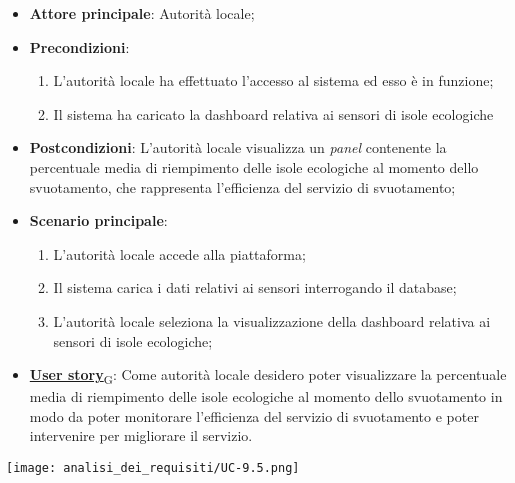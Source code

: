 \begin{itemize}
	\item \textbf{Attore principale}: Autorità locale;
	\item \textbf{Precondizioni}:
	      \begin{enumerate}
		      \item L'autorità locale ha effettuato l'accesso al sistema ed esso è in funzione;
		      \item Il sistema ha caricato la dashboard relativa ai sensori di isole ecologiche
	      \end{enumerate}
	\item \textbf{Postcondizioni}: L'autorità locale visualizza un \textit{panel} contenente la percentuale media di riempimento delle isole ecologiche al momento dello svuotamento,
	      che rappresenta l'efficienza del servizio di svuotamento;
	\item \textbf{Scenario principale}:
	      \begin{enumerate}
		      \item L'autorità locale accede alla piattaforma;
		      \item Il sistema carica i dati relativi ai sensori interrogando il database;
		      \item L'autorità locale seleziona la visualizzazione della dashboard relativa ai sensori di isole ecologiche;
	      \end{enumerate}
	\item \href{https://7last.github.io/docs/rtb/documentazione-interna/glossario\#user-story}{\textbf{User story}\textsubscript{G}}:
	      Come autorità locale desidero poter visualizzare la percentuale media di riempimento delle isole ecologiche al momento dello svuotamento in modo da poter monitorare
	      l'efficienza del servizio di svuotamento e poter intervenire per migliorare il servizio.
\end{itemize}
\begin{center}
	\texttt{[image: analisi\_dei\_requisiti/UC-9.5.png]}
\end{center}


